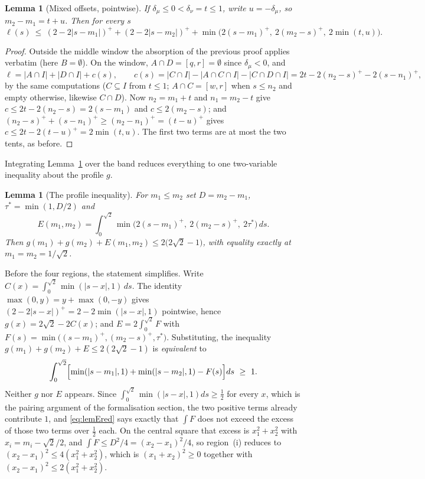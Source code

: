 \documentclass[11pt]{article}
\newtheorem{lemma}[theorem]{Lemma}
\theoremstyle{definition}
\newcommand{\dmu}{\delta_\mu}
\newcommand{\dnu}{\delta_\nu}
\begin{document}
\begin{lemma}[Mixed offsets, pointwise]\label{lem:mixed}
If $\dmu\le0<\dnu=t\le1$, write $u=-\dmu$, so $m_2-m_1=t+u$. Then for every $s$
\[
  \ell(s)\ \le\ (2-2|s-m_1|)^++(2-2|s-m_2|)^+
          +\min\bigl(2(s-m_1)^+,\ 2(m_2-s)^+,\ 2\min(t,u)\bigr).
\]
\end{lemma}

\begin{proof}
Outside the middle window the absorption of the previous proof applies verbatim (here
$B=\emptyset$). On the window, $A\cap D=[q,r]=\emptyset$ since $\dmu<0$, and
\[
  \ell=|A\cap I|+|D\cap I|+c(s),\qquad
  c(s)=|C\cap I|-|A\cap C\cap I|-|C\cap D\cap I|=2t-2(n_2-s)^+-2(s-n_1)^+ ,
\]
by the same computations ($C\subseteq I$ from $t\le1$; $A\cap C=[w,r]$ when $s\le n_2$
and empty otherwise, likewise $C\cap D$). Now $n_2=m_1+t$ and $n_1=m_2-t$ give
$c\le2t-2(n_2-s)=2(s-m_1)$ and $c\le2(m_2-s)$; and
$(n_2-s)^++(s-n_1)^+\ge(n_2-n_1)^+=(t-u)^+$ gives $c\le2t-2(t-u)^+=2\min(t,u)$. The
first two terms are at most the two tents, as before.
\end{proof}

Integrating Lemma~\ref{lem:mixed} over the band reduces everything to one two-variable
inequality about the profile $g$.

\begin{lemma}[The profile inequality]\label{lem:profineq}
For $m_1\le m_2$ set $D=m_2-m_1$, $\tau^\ast=\min(1,D/2)$ and
\[
  E(m_1,m_2)=\int_0^{\sqrt2}\min\bigl(2(s-m_1)^+,\ 2(m_2-s)^+,\ 2\tau^\ast\bigr)\,ds .
\]
Then $g(m_1)+g(m_2)+E(m_1,m_2)\le2\bigl(2\sqrt2-1\bigr)$, with equality exactly at
$m_1=m_2=1/\sqrt2$.
\end{lemma}

Before the four regions, the statement simplifies. Write
$C(x)=\int_0^{\sqrt2}\min(|s-x|,1)\,ds$. The identity $\max(0,y)=y+\max(0,-y)$ gives
$(2-2|s-x|)^+=2-2\min(|s-x|,1)$ pointwise, hence $g(x)=2\sqrt2-2C(x)$; and
$E=2\int_0^{\sqrt2}F$ with
$F(s)=\min\bigl((s-m_1)^+,(m_2-s)^+,\tau^\ast\bigr)$. Substituting, the inequality
$g(m_1)+g(m_2)+E\le2(2\sqrt2-1)$ is \emph{equivalent} to
\begin{equation}\label{eq:lemEred}
  \int_0^{\sqrt2}\Bigl[\min(|s-m_1|,1)+\min(|s-m_2|,1)-F(s)\Bigr]ds\ \ge\ 1 .
\end{equation}
Neither $g$ nor $E$ appears. Since $\int_0^{\sqrt2}\min(|s-x|,1)ds\ge\tfrac12$ for every
$x$, which is the pairing argument of the formalisation section, the two positive terms
already contribute $1$, and \eqref{eq:lemEred} says exactly that $\int F$ does not exceed
the excess of those two terms over $\tfrac12$ each. On the central square that excess is
$x_1^2+x_2^2$ with $x_i=m_i-\sqrt2/2$, and $\int F\le D^2/4=(x_2-x_1)^2/4$, so region~(i)
reduces to $(x_2-x_1)^2\le4(x_1^2+x_2^2)$, which is $(x_1+x_2)^2\ge0$ together with
$(x_2-x_1)^2\le2(x_1^2+x_2^2)$.
\end{document}
